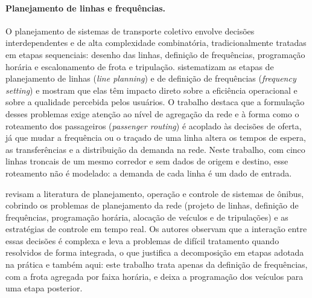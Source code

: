 \documentclass[11pt,a4paper]{article}
\begin{document}
\paragraph{Planejamento de linhas e frequências.}
O planejamento de sistemas de transporte coletivo envolve decisões
interdependentes e de alta complexidade combinatória, tradicionalmente tratadas
em etapas sequenciais: desenho das linhas, definição de frequências, programação
horária e escalonamento de frota e tripulação. \citet{schmidt2024} sistematizam
as etapas de planejamento de linhas (\emph{line planning}) e de definição de
frequências (\emph{frequency setting}) e mostram que elas têm impacto direto
sobre a eficiência operacional e sobre a qualidade percebida pelos usuários. O
trabalho destaca que a formulação desses problemas exige atenção ao nível de
agregação da rede e à forma como o roteamento dos passageiros (\emph{passenger
routing}) é acoplado às decisões de oferta, já que mudar a frequência ou o
traçado de uma linha altera os tempos de espera, as transferências e a
distribuição da demanda na rede. Neste trabalho, com cinco linhas troncais de um
mesmo corredor e sem dados de origem e destino, esse roteamento não é modelado:
a demanda de cada linha é um dado de entrada.

\citet{ibarrarojas2015} revisam a literatura de planejamento, operação e
controle de sistemas de ônibus, cobrindo os problemas de planejamento da rede
(projeto de linhas, definição de frequências, programação horária, alocação de
veículos e de tripulações) e as estratégias de controle em tempo real. Os
autores observam que a interação entre essas decisões é complexa e leva a
problemas de difícil tratamento quando resolvidos de forma integrada, o que
justifica a decomposição em etapas adotada na prática e também aqui: este
trabalho trata apenas da definição de frequências, com a frota agregada por
faixa horária, e deixa a programação dos veículos para uma etapa posterior.
\end{document}
